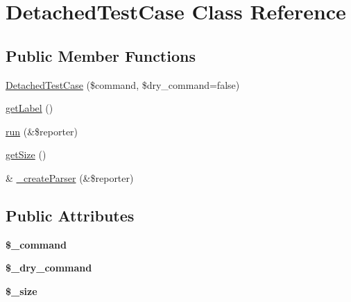 \hypertarget{class_detached_test_case}{
\section{DetachedTestCase Class Reference}
\label{class_detached_test_case}
}
\subsection*{Public Member Functions}
\begin{DoxyCompactItemize}
\item 
\hyperlink{class_detached_test_case_ae9ad4ef5b84ccbeaa2ea8ebc297985ec}{DetachedTestCase} (\$command, \$dry\_\-command=false)
\item 
\hyperlink{class_detached_test_case_a89ea35beebfe6a648e60f40c2828eac6}{getLabel} ()
\item 
\hyperlink{class_detached_test_case_a871095b9262f4a726030cf6ec1ef7496}{run} (\&\$reporter)
\item 
\hyperlink{class_detached_test_case_ac3d57d5d3751a7e5c8d75ce93a83cf9b}{getSize} ()
\item 
\& \hyperlink{class_detached_test_case_ab06be38d7d473fdb0db7267eff27bfce}{\_\-createParser} (\&\$reporter)
\end{DoxyCompactItemize}
\subsection*{Public Attributes}
\begin{DoxyCompactItemize}
\item 
\hypertarget{class_detached_test_case_aa4e1f1c8201acdf66f72ea27a49de7c8}{
{\bfseries \$\_\-command}}
\label{class_detached_test_case_aa4e1f1c8201acdf66f72ea27a49de7c8}

\item 
\hypertarget{class_detached_test_case_a3313d35e96e38292890b064c1244348e}{
{\bfseries \$\_\-dry\_\-command}}
\label{class_detached_test_case_a3313d35e96e38292890b064c1244348e}

\item 
\hypertarget{class_detached_test_case_aa97a612b0122a9bca1f1ea4ced6aabdb}{
{\bfseries \$\_\-size}}
\label{class_detached_test_case_aa97a612b0122a9bca1f1ea4ced6aabdb}

\end{DoxyCompactItemize}


